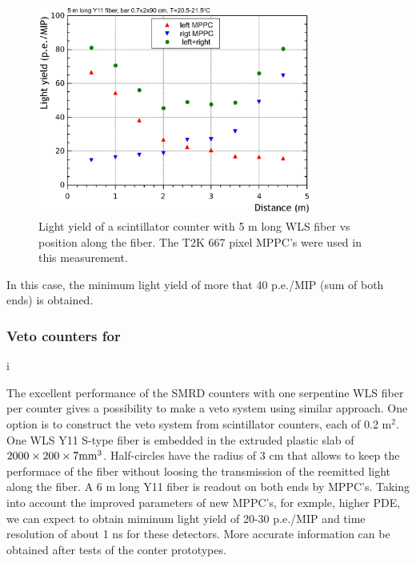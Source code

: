 \begin{figure}[htpb]
\centering\includegraphics[width=9cm]{figures/Graph1.eps}
\caption{Light yield of a scintillator counter with  5 m long WLS  fiber vs position along the fiber. The T2K 667 pixel MPPC's were used in this measurement.}
\label{fig:graph1} 
\end{figure}
In this case, the minimum light yield of more that 40 p.e./MIP (sum of both ends) is obtained.

\subsubsection{Veto counters for \nuprism}

i%


The excellent performance of the SMRD counters with one serpentine WLS fiber per counter gives a possibility to make a veto system using similar approach. One option is to construct the \nuprism veto system from scintillator counters,  each of 0.2 m$^2$.
One WLS Y11 S-type fiber is embedded in the extruded plastic slab of $2000 \times 200 \times 7 {\rm mm}^3$. Half-circles have the radius of 3 cm that allows to keep the performace of the fiber without loosing the transmission of the reemitted light along the fiber. A 6 m long Y11 fiber is readout on both ends by MPPC's. Taking into account the improved parameters of new MPPC's, for exmple, higher PDE, 
we can expect to obtain miminum light yield of 20-30 p.e./MIP and time resolution of about 1 ns for these detectors. More accurate information can be obtained after tests of the conter prototypes. 

